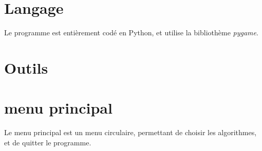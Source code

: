 \section{Langage}
    Le programme est entièrement codé en Python,
    et utilise la bibliothème \emph{pygame}.

\section{Outils}

\section{menu principal}
    Le menu principal est un menu circulaire,
    permettant de choisir les algorithmes, et de
    quitter le programme.

